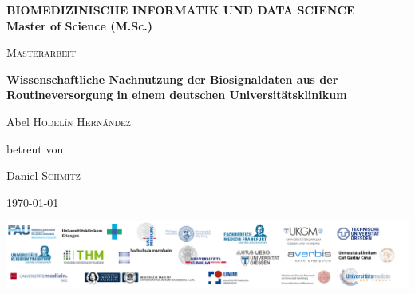 \begin{titlepage}
	\thispagestyle{firstpage}
	\raggedright
	{
		{\normalsize \color{orange} \bfseries BIOMEDIZINISCHE INFORMATIK UND DATA SCIENCE  \\}
		{\normalsize \color{gray} \bfseries Master of Science (M.Sc.)}
		\par
	}
	
	\vspace{1cm}
	
	\centering
	{\scshape\LARGE Masterarbeit \par}
	
	\vspace{1.5cm}
	{\huge \bfseries Wissenschaftliche Nachnutzung der Biosignaldaten aus der Routineversorgung in einem deutschen Universitätsklinikum \par}
	
	\vspace{2cm}
	{\Large Abel \textsc{Hodel\'in Hern\'andez}~\par}
	\vspace{2cm} 
	betreut von\par
	{Daniel \textsc{Schmitz}\par}

	\vspace{2cm}

	{\large \today\par}
	
	\vfill
	
	\includegraphics[width=\textwidth]{figures/onder_document}

	
\end{titlepage}